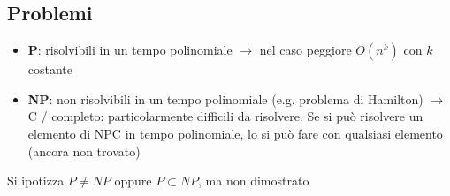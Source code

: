 \documentclass[12pt,a4paper]{article}
\begin{document}
\subsection{Problemi}
\begin{itemize}
\item \textbf{P}: risolvibili in un tempo polinomiale $\rightarrow$ nel caso peggiore $O(n^k)$ con $k$ costante
\item \textbf{NP}: non risolvibili in un tempo polinomiale (e.g. problema di Hamilton) $\rightarrow$ C / completo: particolarmente difficili da risolvere. Se si può risolvere un elemento di NPC in tempo polinomiale, lo si può fare con qualsiasi elemento (ancora non trovato)\\
\end{itemize}
Si ipotizza $P \not = NP$ oppure $P\subset NP$, ma non dimostrato


\end{document}
